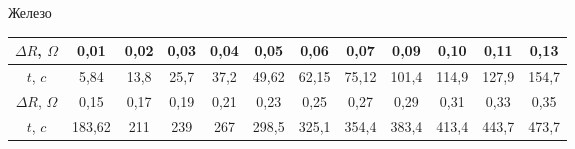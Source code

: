 \documentclass[a4paper, 10pt]{article}%
\begin{document}
Железо
\begin{table}[h!]
\begin{tabular}{|c|c|c|c|c|c|c|c|c|c|c|c|}
\hline
\rowcolor[HTML]{EFEFEF} 
$\Delta R$, $\Omega$ & 0,01   & 0,02 & 0,03 & 0,04 & 0,05  & 0,06  & 0,07  & 0,09  & 0,10  & 0,11  & 0,13  \\ \hline
$t$, $c$             & 5,84   & 13,8 & 25,7 & 37,2 & 49,62 & 62,15 & 75,12 & 101,4 & 114,9 & 127,9 & 154,7 \\ \hline
\rowcolor[HTML]{EFEFEF} 
$\Delta R$, $\Omega$ & 0,15   & 0,17 & 0,19 & 0,21 & 0,23  & 0,25  & 0,27  & 0,29  & 0,31  & 0,33  & 0,35  \\ \hline
$t$, $c$             & 183,62 & 211  & 239  & 267  & 298,5 & 325,1 & 354,4 & 383,4 & 413,4 & 443,7 & 473,7 \\ \hline
\end{tabular}
\end{table}
\end{document}
